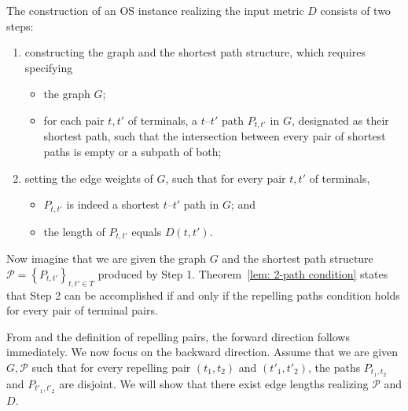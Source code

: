 \documentclass[11pt]{article}
\newcommand{\pset}{{\mathcal{P}}}
\newcommand{\set}[1]{\left\{ #1 \right\}}
\begin{document}
The construction of an OS instance realizing the input metric $D$ consists of two steps:
\begin{enumerate}
    \item constructing the graph and the shortest path structure, which requires specifying
    \label{prop_1}
    \begin{itemize}
        \item the graph $G$;
        \item for each pair $t,t'$ of terminals, a $t$--$t'$ path $P_{t,t'}$ in $G$, designated as their shortest path, such that the intersection between every pair of shortest paths is empty or a subpath of both;
    \end{itemize}
    \item setting the edge weights of $G$, such that for every pair $t,t'$ of terminals,
    \label{prop_2}
    \begin{itemize}
        \item $P_{t,t'}$ is indeed a shortest $t$--$t'$ path in $G$; and
        \item the length of $P_{t,t'}$ equals $D(t,t')$.
    \end{itemize}
\end{enumerate}

Now imagine that we are given the graph $G$ and the shortest path structure $\pset=\set{P_{t,t'}}_{t,t'\in T}$ produced by Step 1. Theorem~\ref{lem: 2-path condition} states that Step 2 can be accomplished if and only if the repelling paths condition holds for every pair of terminal pairs.

From  and the definition of repelling pairs, the forward direction follows immediately. We now focus on the backward direction. Assume that we are given $G,\pset$ such that for every repelling pair $(t_1,t_2)$ and $(t'_1,t'_2)$, the paths $P_{t_1,t_2}$ and $P_{t'_1,t'_2}$ are disjoint. We will show that there exist edge lengths realizing $\pset$ and $D$.
\end{document}
